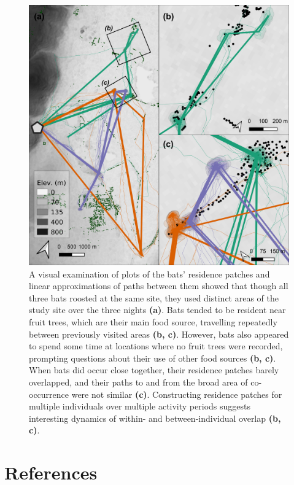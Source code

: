 \documentclass[]{scrreprt}
\begin{document}
\begin{figure}
\centering
\includegraphics{figures/fig_08_bats.png}
\caption{A visual examination of plots of the bats' residence patches and linear approximations of paths between them showed that though all three bats roosted at the same site, they used distinct areas of the study site over the three nights \textbf{(a)}.
Bats tended to be resident near fruit trees, which are their main food source, travelling repeatedly between previously visited areas \textbf{(b, c)}.
However, bats also appeared to spend some time at locations where no fruit trees were recorded, prompting questions about their use of other food sources \textbf{(b, c)}.
When bats did occur close together, their residence patches barely overlapped, and their paths to and from the broad area of co-occurrence were not similar \textbf{(c)}.
Constructing residence patches for multiple individuals over multiple activity periods suggests interesting dynamics of within- and between-individual overlap \textbf{(b, c)}.}
\end{figure}

\hypertarget{references}{%
\chapter{References}\label{references}}
\end{document}
